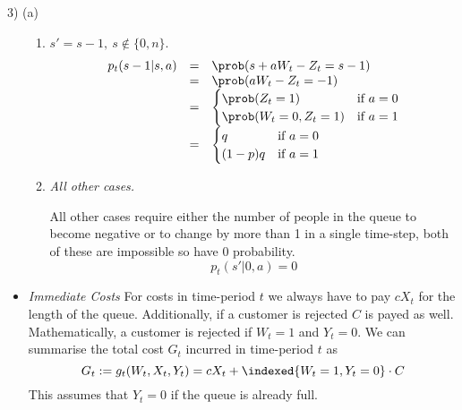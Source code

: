 \documentclass[11pt,a4paper]{article}
\begin{document}
\begin{answer}{3) (a)}
\begin{itemize}
\begin{enumerate}
      \item $s'=s-1,\ s\not\in\{0,n\}$.
      \[\begin{array}{rcl}
        p_t(s-1|s,a)&=&\prob(s+aW_t-Z_t=s-1)\\
        &=&\prob(aW_t-Z_t=-1)\\
        &=&\begin{cases}
             \prob(Z_t=1)&\text{if }a=0\\
             \prob(W_t=0,Z_t=1)&\text{if }a=1
           \end{cases}\\
        &=&\begin{cases}
             q&\text{if }a=0\\
             (1-p)q&\text{if }a=1
           \end{cases}
      \end{array}\]

      \item \textit{All other cases.}
      \par All other cases require either the number of people in the queue to become negative or to change by more than 1 in a single time-step, both of these are impossible so have 0 probability.
      \[ p_t(s'|0,a)=0 \]

    \end{enumerate}

    \item \textit{Immediate Costs}
    For costs in time-period $t$ we always have to pay $cX_t$ for the length of the queue. Additionally, if a customer is rejected $C$ is payed as well. Mathematically, a customer is rejected if $W_t=1$ and $Y_t=0$. We can summarise the total cost $G_t$ incurred in time-period $t$ as
    \[ G_t:=g_t(W_t,X_t,Y_t)=cX_t+\indexed\{W_t=1,Y_t=0\}\cdot C \]
    This assumes that $Y_t=0$ if the queue is already full.


\end{itemize}
\end{answer}
\end{document}
